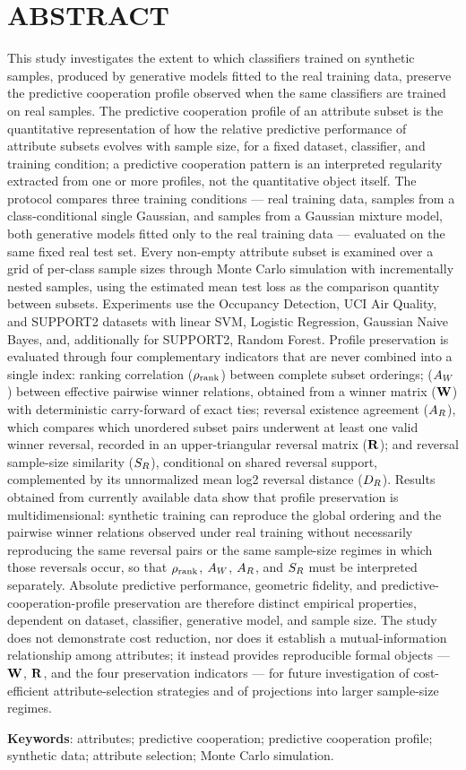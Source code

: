 \clearpage
{}
\chapter*{ABSTRACT}

This study investigates the extent to which classifiers trained on synthetic samples, produced by generative models fitted to the real training data, preserve the predictive cooperation profile observed when the same classifiers are trained on real samples. The predictive cooperation profile of an attribute subset is the quantitative representation of how the relative predictive performance of attribute subsets evolves with sample size, for a fixed dataset, classifier, and training condition; a predictive cooperation pattern is an interpreted regularity extracted from one or more profiles, not the quantitative object itself. The protocol compares three training conditions --- real training data, samples from a class-conditional single Gaussian, and samples from a Gaussian mixture model, both generative models fitted only to the real training data --- evaluated on the same fixed real test set. Every non-empty attribute subset is examined over a grid of per-class sample sizes through Monte Carlo simulation with incrementally nested samples, using the estimated mean test loss as the comparison quantity between subsets. Experiments use the Occupancy Detection, UCI Air Quality, and SUPPORT2 datasets with linear SVM, Logistic Regression, Gaussian Naive Bayes, and, additionally for SUPPORT2, Random Forest. Profile preservation is evaluated through four complementary indicators that are never combined into a single index: ranking correlation ($\rho_{\mathrm{rank}}$) between complete subset orderings; \WinnersAgreement{} ($A_W$) between effective pairwise winner relations, obtained from a winner matrix ($\mathbf{W}$) with deterministic carry-forward of exact ties; reversal existence agreement ($A_R$), which compares which unordered subset pairs underwent at least one valid winner reversal, recorded in an upper-triangular reversal matrix ($\mathbf{R}$); and reversal sample-size similarity ($S_R$), conditional on shared reversal support, complemented by its unnormalized mean log2 reversal distance ($D_R$). Results obtained from currently available data show that profile preservation is multidimensional: synthetic training can reproduce the global ordering and the pairwise winner relations observed under real training without necessarily reproducing the same reversal pairs or the same sample-size regimes in which those reversals occur, so that $\rho_{\mathrm{rank}}$, $A_W$, $A_R$, and $S_R$ must be interpreted separately. Absolute predictive performance, geometric fidelity, and predictive-cooperation-profile preservation are therefore distinct empirical properties, dependent on dataset, classifier, generative model, and sample size. The study does not demonstrate cost reduction, nor does it establish a mutual-information relationship among attributes; it instead provides reproducible formal objects --- $\mathbf{W}$, $\mathbf{R}$, and the four preservation indicators --- for future investigation of cost-efficient attribute-selection strategies and of projections into larger sample-size regimes.

\vspace{\onelineskip}
\noindent\textbf{Keywords}: attributes; predictive cooperation; predictive cooperation profile; synthetic data; attribute selection; Monte Carlo simulation.
